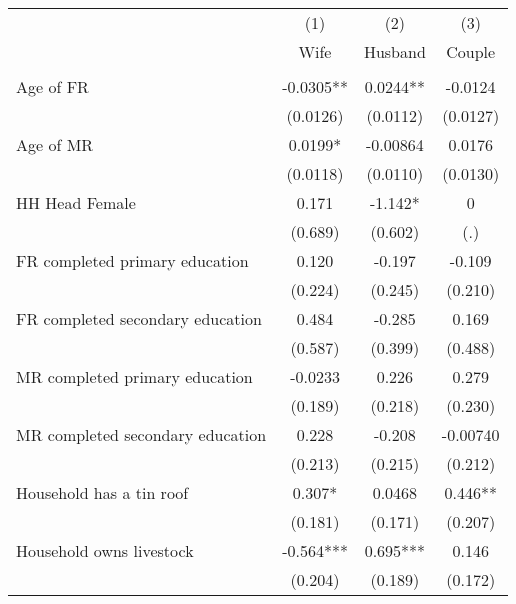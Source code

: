 {
\def\sym#1{\ifmmode^{#1}\else\(^{#1}\)\fi}
\begin{tabular}{l*{3}{c}}
\hline\hline
                    &\multicolumn{1}{c}{(1)}   &\multicolumn{1}{c}{(2)}   &\multicolumn{1}{c}{(3)}   \\
                    &        Wife   &     Husband   &      Couple   \\
\hline
                    &               &               &               \\
Age of FR           &     -0.0305** &      0.0244** &     -0.0124   \\
                    &    (0.0126)   &    (0.0112)   &    (0.0127)   \\
[1em]
Age of MR           &      0.0199*  &    -0.00864   &      0.0176   \\
                    &    (0.0118)   &    (0.0110)   &    (0.0130)   \\
[1em]
HH Head Female      &       0.171   &      -1.142*  &           0   \\
                    &     (0.689)   &     (0.602)   &         (.)   \\
[1em]
FR completed primary education&       0.120   &      -0.197   &      -0.109   \\
                    &     (0.224)   &     (0.245)   &     (0.210)   \\
[1em]
FR completed secondary education&       0.484   &      -0.285   &       0.169   \\
                    &     (0.587)   &     (0.399)   &     (0.488)   \\
[1em]
MR completed primary education&     -0.0233   &       0.226   &       0.279   \\
                    &     (0.189)   &     (0.218)   &     (0.230)   \\
[1em]
MR completed secondary education&       0.228   &      -0.208   &    -0.00740   \\
                    &     (0.213)   &     (0.215)   &     (0.212)   \\
[1em]
Household has a tin roof&       0.307*  &      0.0468   &       0.446** \\
                    &     (0.181)   &     (0.171)   &     (0.207)   \\
[1em]
Household owns livestock&      -0.564***&       0.695***&       0.146   \\
                    &     (0.204)   &     (0.189)   &     (0.172)   \\
[1em]

\end{tabular}}
